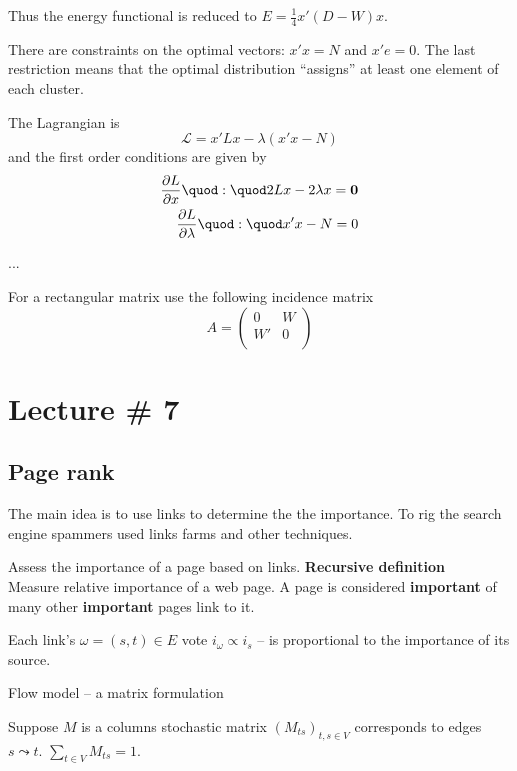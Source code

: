 \documentclass[a4paper]{article}
\newcommand{\brac}[1]{{\left ( #1 \right )}}
\begin{document}
Thus the energy functional is reduced to $E = \frac{1}{4} x' ( D - W ) x $.

There are constraints on the optimal vectors: $x'x = N$ and $x'e = 0$. The last restriction means that the optimal distribution ``assigns'' at least one element of each cluster.

The Lagrangian is 
\[\mathcal{L} = x'Lx - \lambda ( x'x - N )\]
and the first order conditions are given by
\begin{align*}
	\frac{\partial L}{\partial x} \quod:\quod 2Lx - 2\lambda x = \mathbf{0}\\
	\frac{\partial L}{\partial \lambda} \quod:\quod x'x - N = 0
\end{align*} 

...

For a rectangular matrix use the following incidence matrix
\[A = \left(\begin{matrix}
	0&W\\
	W'&0\\
\end{matrix}\right)\]



\section{Lecture \# 7} %
\label{sec:lecture_7}

\subsection{Page rank} %
\label{sub:page_rank}

The main idea is to use links to determine the the importance.
To rig the search engine spammers used links farms and other techniques.

Assess the importance of a page based on links.
\noindent \textbf{Recursive definition}\hfill\\
Measure relative importance of a web page. A page is considered \textbf{important} of many other \textbf{important} pages link to it.

Each link's $\omega = (s,t)\in E$ vote $i_\omega \propto i_s$ -- is proportional to the importance of its source.

Flow model -- a matrix formulation

Suppose $M$ is a columns stochastic matrix $\brac{M_{ts}}_{t,s\in V}$ corresponds to edges $s\leadsto t$.
$\sum_{t\in V}M_{ts} = 1$.
\end{document}
